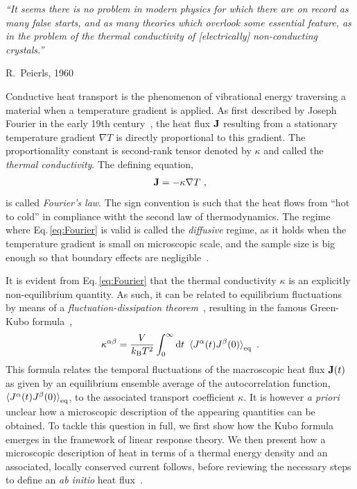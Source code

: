 \epigraph{\singlespacing \it ``It seems there is no problem in modern physics for which there are on record as many false starts, and as many theories which overlook some essential feature, as in the problem of the thermal conductivity of [electrically] non-conducting crystals.''}{R.~Peierls, 1960~\cite{Peierls1960}}


Conductive heat transport is the phenomenon of vibrational energy traversing a material when a temperature gradient is applied. As first described by Joseph Fourier in the early 19th century~\cite{Fourier1878}, the heat flux ${\bf J}$ resulting from a stationary temperature gradient $\nabla T$ is directly proportional to this gradient. The proportionality constant is second-rank tensor denoted by $\kappa$ and called the \emph{thermal conductivity}. The defining equation,
\begin{align}
  \b J = - \kappa \nabla T~,
  \label{eq:Fourier}
\end{align}
is called \emph{Fourier's law}. The sign convention is such that the heat flows from ``hot to cold'' in compliance witht the second law of thermodynamics. The regime where Eq.\,\eqref{eq:Fourier} is valid is called the \emph{diffusive} regime, as it holds when the temperature gradient is small on microscopic scale, and the sample size is big enough so that boundary effects are negligible~\cite{Kapitza1941a,Antidormi2020}.

It is evident from Eq.\,\eqref{eq:Fourier} that the thermal conductivity $\kappa$ is an explicitly non-equilibrium quantity. As such, it can be related to equilibrium fluctuations by means of a \emph{fluctuation-dissipation theorem}~\cite{Einstein1905a,Nyquist1928,Callen1951,Kubo1957a}, resulting in the famous Green-Kubo formula~\cite{Green1952,Kubo1957b},
\begin{align}
  \kappa^{\alpha \beta} = \frac{V}{k_{\rm B} T^2} \int_{0}^{\infty} \d t ~
    \braket{J^\alpha (t) J^\beta(0)}_{\rm eq}~.
  \label{eq:GreenKubo}
\end{align}
This formula relates the temporal fluctuations of the macroscopic heat flux ${\bf J} (t)$ as given by an equilibrium ensemble average of the autocorrelation function, $\braket{J^\alpha (t) J^\beta(0)}_{\rm eq}$, to the associated transport coefficient $\kappa$. It is however \emph{a priori} unclear how a microscopic description of the appearing quantities can be obtained. To tackle this question in full, we first show how the Kubo formula emerges in the framework of linear response theory. We then present how a microscopic description of heat in terms of a thermal energy density and an associated, locally conserved current follows, before reviewing the necessary steps to define an \emph{ab initio} heat flux~\cite{Carbogno2016}.

